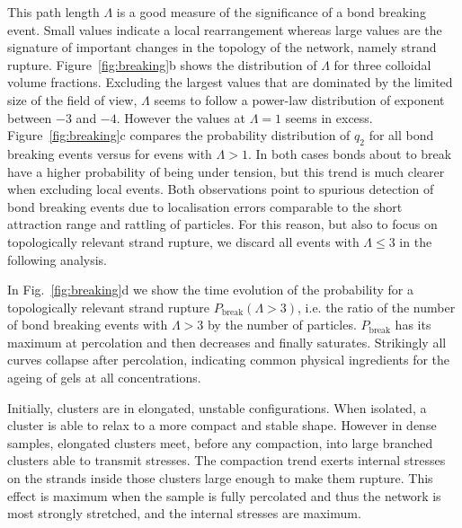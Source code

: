 \documentclass[footinbib,amsmath,amssymb,superscriptaddress,twocolumn]{revtex4}
\begin{document}
This path length $\Lambda$ is a good measure of the significance of a bond breaking event. Small values indicate a local rearrangement whereas large values are the signature of important changes in the topology of the network, namely strand rupture. Figure~\ref{fig:breaking}b shows the distribution of $\Lambda$ for three colloidal volume fractions. Excluding the largest values that are dominated by the limited size of the field of view, $\Lambda$ seems to follow a power-law distribution of exponent between $-3$ and $-4$. However the values at $\Lambda=1$ seems in excess. Figure~\ref{fig:breaking}c compares the probability distribution of $q_2$ for all bond breaking events versus for evens with $\Lambda>1$. In both cases bonds about to break have a higher probability of being under tension, but this trend is much clearer when excluding local events. Both observations point to spurious detection of bond breaking events due to localisation errors comparable to the short attraction range and rattling of particles. For this reason, but also to focus on topologically relevant strand rupture, we discard all events with $\Lambda \leq 3$ in the following analysis.

In Fig.~\ref{fig:breaking}d we show the time evolution of the probability for a topologically relevant strand rupture $P_\text{break}(\Lambda>3)$, i.e. the ratio of the number of bond breaking events with $\Lambda>3$ by the number of particles. $P_\text{break}$ has its maximum at percolation and then decreases and finally saturates. Strikingly all curves collapse after percolation, indicating common physical ingredients for the ageing of gels at all concentrations.

Initially, clusters are in elongated, unstable configurations. When isolated, a cluster is able to relax to a more compact and stable shape. However in dense samples, elongated clusters meet, before any compaction, into large branched clusters able to transmit stresses. The compaction trend exerts internal stresses on the strands inside those clusters large enough to make them rupture. This effect is maximum when the sample is fully percolated and thus the network is most strongly stretched, and the internal stresses are maximum.
\end{document}
